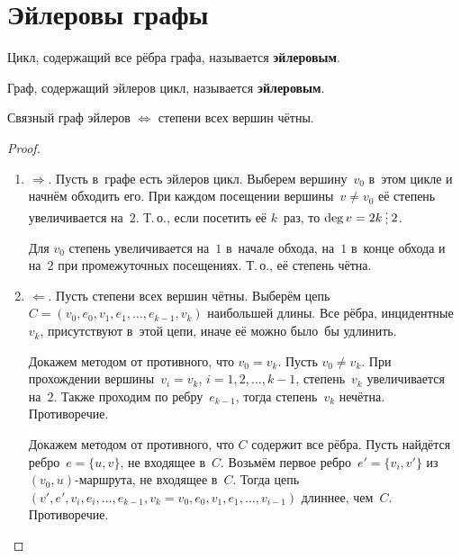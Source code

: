 \section{Эйлеровы графы}
Цикл, содержащий все рёбра графа, называется \textbf{эйлеровым}.

 Граф, содержащий эйлеров цикл, называется \textbf{эйлеровым}.

\begin{theorem}
Связный граф эйлеров $\Leftrightarrow$ степени всех вершин чётны.
\end{theorem}
\begin{proof}
\begin{enumerate}
	\item $\Rightarrow$. Пусть в~графе есть эйлеров цикл.
	Выберем вершину~$v_0$ в~этом цикле и начнём обходить его.
	При каждом посещении вершины~$v \neq v_0$ её степень увеличивается на~$2$.
	Т.\,о., если посетить её $k$~раз, то $\deg v = 2k \mult 2$.
	
	Для $v_0$ степень увеличивается на~$1$ в~начале обхода, на~$1$ в~конце обхода и на~$2$ при промежуточных посещениях.
	Т.\,о., её степень чётна.
	
	\item $\Leftarrow$. Пусть степени всех вершин чётны.
	Выберём цепь~$C = (v_0, e_0, v_1, e_1, \ldots, e_{k-1}, v_k)$ наибольшей длины.
	Все рёбра, инцидентные~$v_k$, присутствуют в~этой цепи, иначе её можно было~бы удлинить.
	
	Докажем методом от противного, что $v_0 = v_k$.
	Пусть $v_0 \neq v_k$.
	При прохождении вершины~$v_i = v_k$, $i = 1, 2, \ldots, k - 1$, степень~$v_k$ увеличивается на~$2$.
	Также проходим по ребру~$e_{k-1}$, тогда степень~$v_k$ нечётна.
	Противоречие.
	
	Докажем методом от противного, что $C$ содержит все рёбра.	
	Пусть найдётся ребро~$e = \{ u, v \}$, не входящее в~$C$.
	Возьмём первое ребро~$e' = \{ v_i, v' \}$ из $(v_0, u)$-маршрута, не входящее в~$C$.
	Тогда цепь~$(v', e', v_i, e_i, \ldots, e_{k-1}, v_k = v_0, e_0, v_1, e_1, \ldots, v_{i-1})$ длиннее, чем~$C$.
	Противоречие.
\end{enumerate}
\end{proof}

